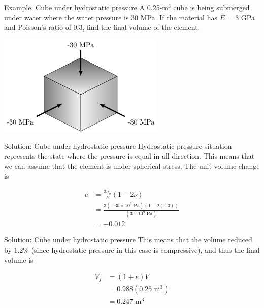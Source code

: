 \documentclass[10pt, svgnames]{beamer}
\begin{document}
\begin{frame}[label={sec:orgae04664}]{Example: Cube under hydrostatic pressure}
A 0.25-m\(^3\) cube is being submerged under water where the water pressure is 30 MPa. If the material has \(E\) = 3 GPa and Poisson's ratio of 0.3, find the final volume of the element.

\begin{center}
\includegraphics[width=0.6\textwidth]{pictures/cube-under-hydro-pressure.pdf}
\end{center}
\end{frame}

\begin{frame}[label={sec:orgf69a7fd}]{Solution: Cube under hydrostatic pressure}
Hydrostatic pressure situation represents the state where the pressure is equal in all direction. This means that we can assume that the element is under spherical stress. The unit volume change is

\begin{align*}
  e &= \frac{3\sigma_o}{E}(1 - 2\nu ) \\ 
    &= \frac{3(-30 \times 10^6 \text{ Pa})(1 - 2(0.3))}{(3 \times 10^9 \text{ Pa})} \\ 
    &= -0.012 
\end{align*}
\end{frame}

\begin{frame}[label={sec:org9e2727a}]{Solution: Cube under hydrostatic pressure}
This means that the volume reduced by 1.2\% (since hydrostatic pressure in this case is compressive), and thus the final volume is

\begin{align*}
  V_f &= (1 + e)V \\ 
      &= 0.988(0.25 \text{ m}^3) \\ 
      &= 0.247 \text{ m}^3
\end{align*}
\end{frame}
\end{document}
